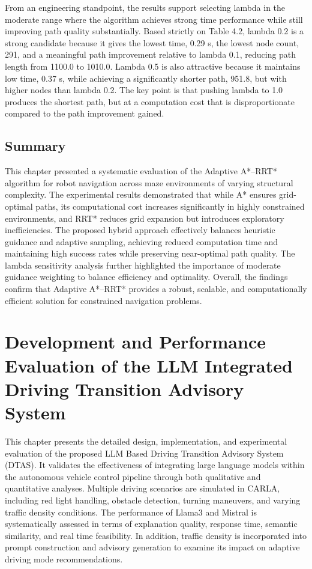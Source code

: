 \documentclass[a4paper,12pt,one side]{report}
\theoremstyle{definition}
\begin{document}
\begin{itemize}
From an engineering standpoint, the results support selecting lambda in the moderate range where the algorithm achieves strong time performance while still improving path quality substantially. Based strictly on Table 4.2, lambda 0.2 is a strong candidate because it gives the lowest time, 0.29 s, the lowest node count, 291, and a meaningful path improvement relative to lambda 0.1, reducing path length from 1100.0 to 1010.0. Lambda 0.5 is also attractive because it maintains low time, 0.37 s, while achieving a significantly shorter path, 951.8, but with higher nodes than lambda 0.2. The key point is that pushing lambda to 1.0 produces the shortest path, but at a computation cost that is disproportionate compared to the path improvement gained.

\section{Summary}

This chapter presented a systematic evaluation of the Adaptive A*–RRT* algorithm for robot navigation across maze environments of varying structural complexity. The experimental results demonstrated that while A* ensures grid-optimal paths, its computational cost increases significantly in highly constrained environments, and RRT* reduces grid expansion but introduces exploratory inefficiencies. The proposed hybrid approach effectively balances heuristic guidance and adaptive sampling, achieving reduced computation time and maintaining high success rates while preserving near-optimal path quality. The lambda sensitivity analysis further highlighted the importance of moderate guidance weighting to balance efficiency and optimality. Overall, the findings confirm that Adaptive A*–RRT* provides a robust, scalable, and computationally efficient solution for constrained navigation problems.
\chapter{Development and Performance Evaluation of the LLM Integrated Driving Transition Advisory System}

This chapter presents the detailed design, implementation, and experimental evaluation of the proposed LLM Based Driving Transition Advisory System (DTAS). It validates the effectiveness of integrating large language models within the autonomous vehicle control pipeline through both qualitative and quantitative analyses. Multiple driving scenarios are simulated in CARLA, including red light handling, obstacle detection, turning maneuvers, and varying traffic density conditions. The performance of Llama3 \cite{dubey2024llama} and Mistral \cite{hamzah2024multimodal} is systematically assessed in terms of explanation quality, response time, semantic similarity, and real time feasibility. In addition, traffic density is incorporated into prompt construction and advisory generation to examine its impact on adaptive driving mode recommendations.


\end{itemize}
\end{document}
